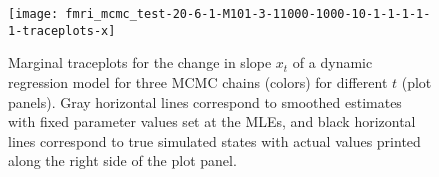 \documentclass{article}
\begin{document}
\begin{figure}[ht]
\texttt{[image: fmri\_mcmc\_test-20-6-1-M101-3-11000-1000-10-1-1-1-1-1-traceplots-x]}
\caption{Marginal traceplots for the change in slope $x_t$ of a dynamic regression model for three MCMC chains (colors) for different $t$ (plot panels). Gray horizontal lines correspond to smoothed estimates with fixed parameter values set at the MLEs, and black horizontal lines correspond to true simulated states with actual values printed along the right side of the plot panel.} \label{fig:tracex}
\end{figure}

%
%
\end{document}
